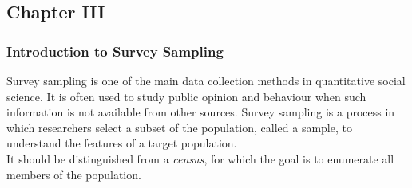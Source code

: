 \documentclass{article}
\begin{document}
    \subsection{Chapter III}
    \subsubsection{Introduction to Survey Sampling}

    \noindent Survey sampling is one of the main data collection methods in
quantitative social science. It is often used to study public opinion and
behaviour when such information is not available from other sources. Survey
sampling is a process in which researchers select a subset of the
population, called a sample, to understand the features of a target
population.\\

    \noindent It should be distinguished from a \textit{census}, for which
the goal is to enumerate all members of the population.\\
\end{document}
